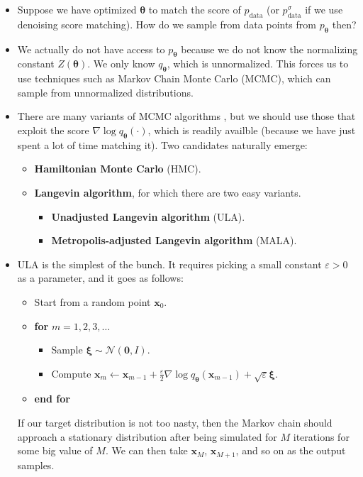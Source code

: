 \documentclass[10pt]{article}
\newcommand{\ve}[1]{\mathbf{#1}}
\newcommand{\mrm}[1]{\mathrm{#1}}
\newcommand{\ves}[1]{\boldsymbol{#1}}
\newcommand{\mcal}[1]{\mathcal{#1}}
\begin{document}
\begin{itemize}
  \item Suppose we have optimized $\ves{\theta}$ to match the score of $p_{\mrm{data}}$ (or $p_{\mrm{data}}^\sigma$ if we use denoising score matching). How do we sample from data points from $p_{\ves{\theta}}$ then?
  
  \item We actually do not have access to $p_{\ves{\theta}}$ because we do not know the normalizing constant $Z(\ves{\theta})$. We only know $q_{\ves{\theta}}$, which is unnormalized. This forces us to use techniques such as Markov Chain Monte Carlo (MCMC), which can sample from unnormalized distributions.
  
  \item There are many variants of MCMC algorithms \cite{KhungurnMcmc}, but we should use those that exploit the score $\nabla \log q_{\ves{\theta}}(\cdot)$, which is readily availble (because we have just spent a lot of time matching it). Two candidates naturally emerge:
  \begin{itemize}
    \item {\bf Hamiltonian Monte Carlo} (HMC).
    \item {\bf Langevin algorithm}, for which there are two easy variants.
    \begin{itemize}
      \item {\bf Unadjusted Langevin algorithm} (ULA).
      \item {\bf Metropolis-adjusted Langevin algorithm} (MALA).
    \end{itemize}
  \end{itemize}

  \item ULA is the simplest of the bunch. It requires picking a small constant $\varepsilon > 0$ as a parameter, and it goes as follows:
  \begin{itemize}
    \item Start from a random point $\ve{x}_0$.
    \item {\bf for} $m = 1, 2, 3, \dotsc$
    \begin{itemize}
      \item Sample $\ves{\xi} \sim \mcal{N}(\ve{0}, I)$.
      \item Compute $\ve{x}_{m} \gets \ve{x}_{m-1} + \frac{\varepsilon}{2} \nabla \log q_{\ves{\theta}}(\ve{x}_{m-1}) + \sqrt{\varepsilon} \ves{\xi}$.
    \end{itemize}
    \item[] {\bf end for}
  \end{itemize}
  If our target distribution is not too nasty, then the Markov chain should approach a stationary distribution after being simulated for $M$ iterations for some big value of $M$. We can then take $\ve{x}_M$, $\ve{x}_{M+1}$, and so on as the output samples.


\end{itemize}
\end{document}
